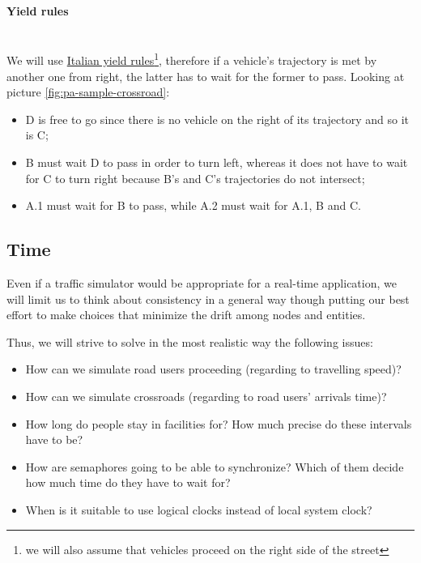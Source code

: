 \paragraph{Yield rules} \mbox{} \\

We will use \href{http://www.aci.it/i-servizi/normative/codice-della-strada/titolo-v-norme-di-comportamento/art-145-precedenza.html}{Italian yield rules}\footnote{we will also assume that vehicles proceed on the right side of the
street}, therefore if a vehicle's trajectory is met by another one from right,
the latter has to wait for the former to pass.
Looking at picture \ref{fig:pa-sample-crossroad}:
\begin{itemize}
    \item D is free to go since there is no vehicle on the right of its trajectory and so it is C;
    \item B must wait D to pass in order to turn left, whereas it does not have to wait
for C to turn right because B's and C's trajectories do not intersect;
    \item A.1 must wait for B to pass, while A.2 must wait for A.1, B and C.
\end{itemize}


\subsection{Time}\label{sec:pa-time-problems}
Even if a traffic simulator would be appropriate for a real-time application,
we will limit us to think about consistency in a general way though putting our
best effort to make choices that minimize the drift among nodes and entities.

Thus, we will strive to solve in the most realistic way the following issues:

\begin{itemize}
\item How can we simulate road users proceeding (regarding to travelling
  speed)?
\item How can we simulate crossroads (regarding to road users' arrivals time)?
\item How long do people stay in facilities for? How much precise do these
  intervals have to be?
\item How are semaphores going to be able to synchronize? Which of them decide
  how much time do they have to wait for?
\item When is it suitable to use logical clocks instead of local system clock?
\end{itemize}
